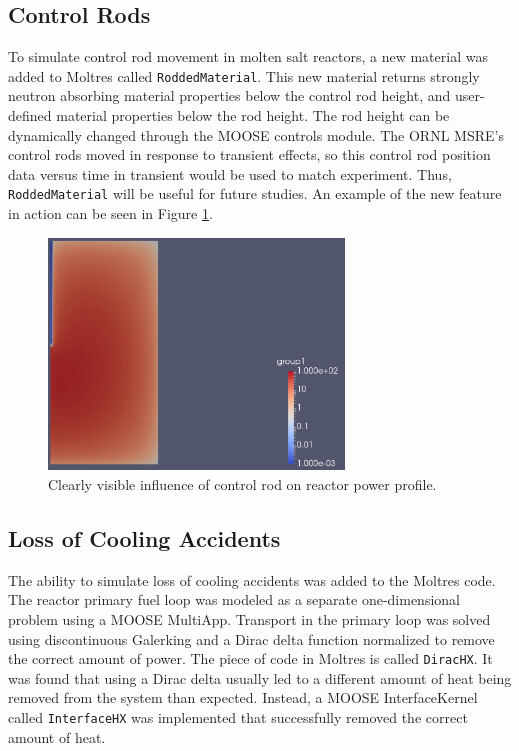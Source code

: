 \subsection{Control Rods}

To simulate control rod movement in molten salt reactors, a new material was added to Moltres \cite{moltres} called \texttt{RoddedMaterial}. This new material returns strongly neutron absorbing material properties below the control rod height, and user-defined material properties below the rod height. The rod height can be dynamically changed through the MOOSE controls module. The ORNL MSRE's control rods moved in response to transient effects, so this control rod position data versus time in transient would be used to match experiment. Thus, \texttt{RoddedMaterial} will be useful for future studies. An example of the new feature in action can be seen in Figure \ref{fig:controlrod}.

\begin{figure}
\centering
\includegraphics[width=0.7\textwidth]{controlrod}
\caption{Clearly visible influence of control rod on reactor power profile.}
\label{fig:controlrod}
\end{figure}

\subsection{Loss of Cooling Accidents}

The ability to simulate loss of cooling accidents was added to the Moltres code. The reactor primary fuel loop was modeled as a separate one-dimensional problem using a MOOSE MultiApp. Transport in the primary loop was solved using discontinuous Galerking and a Dirac delta function normalized to remove the correct amount of power. The piece of code in Moltres is called \texttt{DiracHX}. It was found that using a Dirac delta usually led to a different amount of heat being removed from the system than expected. Instead, a MOOSE InterfaceKernel called \texttt{InterfaceHX} was implemented that successfully removed the correct amount of heat.

